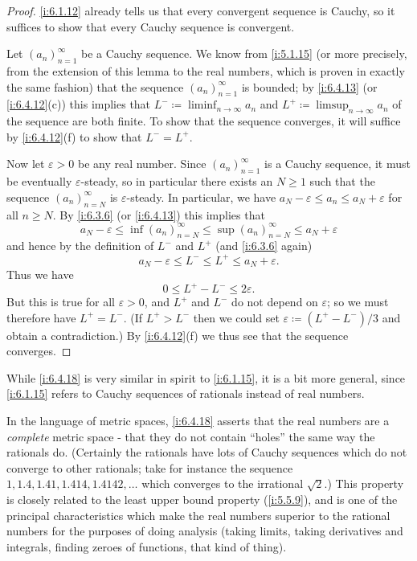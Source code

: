 \begin{proof}
  \cref{i:6.1.12} already tells us that every convergent sequence is Cauchy, so it suffices to show that every Cauchy sequence is convergent.

  Let \((a_n)_{n = 1}^\infty\) be a Cauchy sequence.
  We know from \cref{i:5.1.15} (or more precisely, from the extension of this lemma to the real numbers, which is proven in exactly the same fashion) that the sequence \((a_n)_{n = 1}^\infty\) is bounded;
  by \cref{i:6.4.13} (or \cref{i:6.4.12}(c)) this implies that \(L^- \coloneqq \liminf_{n \to \infty} a_n\) and \(L^+ \coloneqq \limsup_{n \to \infty} a_n\) of the sequence are both finite.
  To show that the sequence converges, it will suffice by \cref{i:6.4.12}(f) to show that \(L^- = L^+\).

  Now let \(\varepsilon > 0\) be any real number.
  Since \((a_n)_{n = 1}^\infty\) is a Cauchy sequence, it must be eventually \(\varepsilon\)-steady, so in particular there exists an \(N \geq 1\) such that the sequence \((a_n)_{n = N}^\infty\) is \(\varepsilon\)-steady.
  In particular, we have \(a_N - \varepsilon \leq a_n \leq a_N + \varepsilon\) for all \(n \geq N\).
  By \cref{i:6.3.6} (or \cref{i:6.4.13}) this implies that
  \[
    a_N - \varepsilon \leq \inf(a_n)_{n = N}^\infty \leq \sup(a_n)_{n = N}^\infty \leq a_N + \varepsilon
  \]
  and hence by the definition of \(L^-\) and \(L^+\) (and \cref{i:6.3.6} again)
  \[
    a_N - \varepsilon \leq L^- \leq L^+ \leq a_N + \varepsilon.
  \]
  Thus we have
  \[
    0 \leq L^+ - L^- \leq 2\varepsilon.
  \]
  But this is true for all \(\varepsilon > 0\), and \(L^+\) and \(L^-\) do not depend on \(\varepsilon\);
  so we must therefore have \(L^+ = L^-\).
  (If \(L^+ > L^-\) then we could set \(\varepsilon \coloneqq (L^+ - L^-) / 3\) and obtain a contradiction.)
  By \cref{i:6.4.12}(f) we thus see that the sequence converges.
\end{proof}

\begin{rmk}\label{i:6.4.19}
  While \cref{i:6.4.18} is very similar in spirit to \cref{i:6.1.15}, it is a bit more general, since \cref{i:6.1.15} refers to Cauchy sequences of rationals instead of real numbers.
\end{rmk}

\begin{rmk}\label{i:6.4.20}
  In the language of metric spaces, \cref{i:6.4.18} asserts that the real numbers are a \emph{complete} metric space
  - that they do not contain ``holes'' the same way the rationals do.
  (Certainly the rationals have lots of Cauchy sequences which do not converge to other rationals;
  take for instance the sequence \(1, 1.4, 1.41, 1.414, 1.4142, \dots\) which converges to the irrational \(\sqrt{2}\).)
  This property is closely related to the least upper bound property (\cref{i:5.5.9}), and is one of the principal characteristics which make the real numbers superior to the rational numbers for the purposes of doing analysis
  (taking limits, taking derivatives and integrals, finding zeroes of functions, that kind of thing).
\end{rmk}

